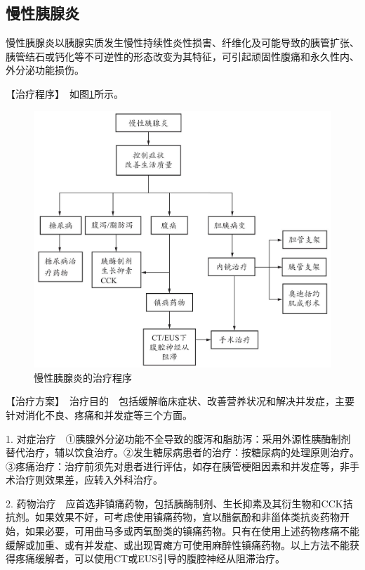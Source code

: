 \subsection{慢性胰腺炎}

慢性胰腺炎以胰腺实质发生慢性持续性炎性损害、纤维化及可能导致的胰管扩张、胰管结石或钙化等不可逆性的形态改变为其特征，可引起顽固性腹痛和永久性内、外分泌功能损伤。

【治疗程序】　如图\ref{fig3-18-3}所示。

\begin{figure}[!htbp]
 \centering
 \includegraphics{./images/Image00109.jpg}
 \captionsetup{justification=centering}
 \caption{慢性胰腺炎的治疗程序}
 \label{fig3-18-3}
  \end{figure} 

【治疗方案】　治疗目的　包括缓解临床症状、改善营养状况和解决并发症，主要针对消化不良、疼痛和并发症等三个方面。

1.
对症治疗　①胰腺外分泌功能不全导致的腹泻和脂肪泻：采用外源性胰酶制剂替代治疗，辅以饮食治疗。②发生糖尿病患者的治疗：按糖尿病的处理原则治疗。③疼痛治疗：治疗前须先对患者进行评估，如存在胰管梗阻因素和并发症等，非手术治疗则效果差，应转入外科治疗。

2.
药物治疗　应首选非镇痛药物，包括胰酶制剂、生长抑素及其衍生物和CCK拮抗剂。如果效果不好，可考虑使用镇痛药物，宜以醋氨酚和非甾体类抗炎药物开始，如果必要，可用曲马多或丙氧酚类的镇痛药物。只有在使用上述药物疼痛不能缓解或加重、或有并发症、或出现胃瘫方可使用麻醉性镇痛药物。以上方法不能获得疼痛缓解者，可以使用CT或EUS引导的腹腔神经从阻滞治疗。

